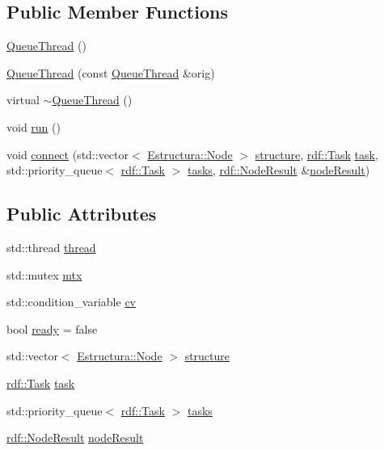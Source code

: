 \subsection*{Public Member Functions}
\begin{DoxyCompactItemize}
\item 
\hyperlink{classQueueThread_a67e91d4fedd650255e9389c50b4e6749}{Queue\+Thread} ()
\item 
\hyperlink{classQueueThread_a4a48439ac971b82fa1dd1b63138a4d2b}{Queue\+Thread} (const \hyperlink{classQueueThread}{Queue\+Thread} \&orig)
\item 
virtual \hyperlink{classQueueThread_aeca7000eb51c2f4d2ec33352c8e08ec3}{$\sim$\+Queue\+Thread} ()
\item 
void \hyperlink{classQueueThread_a73db1449c750aab9c973592a69f12e85}{run} ()
\item 
void \hyperlink{classQueueThread_a873d5d9edf446f44467518c8fbde1800}{connect} (std\+::vector$<$ \hyperlink{structEstructura_1_1Node}{Estructura\+::\+Node} $>$ \hyperlink{classQueueThread_ab591bae3315c80df7fa723db66e763fa}{structure}, \hyperlink{classrdf_1_1Task}{rdf\+::\+Task} \hyperlink{classQueueThread_a4cf069642e3f67ff759a2163fa2ef3ce}{task}, std\+::priority\+\_\+queue$<$ \hyperlink{classrdf_1_1Task}{rdf\+::\+Task} $>$ \hyperlink{classQueueThread_a8e8f59dccfcb4a213db1b42aec0e4f4d}{tasks}, \hyperlink{classrdf_1_1NodeResult}{rdf\+::\+Node\+Result} \&\hyperlink{classQueueThread_aa775f99b02ff36d5336212ae53bd12b4}{node\+Result})
\end{DoxyCompactItemize}
\subsection*{Public Attributes}
\begin{DoxyCompactItemize}
\item 
std\+::thread \hyperlink{classQueueThread_a91bdd16de58d62287968b80f68620033}{thread}
\item 
std\+::mutex \hyperlink{classQueueThread_a7bf4df2e118ced2e8fbbac3af8992d79}{mtx}
\item 
std\+::condition\+\_\+variable \hyperlink{classQueueThread_a51fdcc17ea346cf6bbc51467d49e9696}{cv}
\item 
bool \hyperlink{classQueueThread_a26f11295bff95a8a44bb75a58168d611}{ready} = false
\item 
std\+::vector$<$ \hyperlink{structEstructura_1_1Node}{Estructura\+::\+Node} $>$ \hyperlink{classQueueThread_ab591bae3315c80df7fa723db66e763fa}{structure}
\item 
\hyperlink{classrdf_1_1Task}{rdf\+::\+Task} \hyperlink{classQueueThread_a4cf069642e3f67ff759a2163fa2ef3ce}{task}
\item 
std\+::priority\+\_\+queue$<$ \hyperlink{classrdf_1_1Task}{rdf\+::\+Task} $>$ \hyperlink{classQueueThread_a8e8f59dccfcb4a213db1b42aec0e4f4d}{tasks}
\item 
\hyperlink{classrdf_1_1NodeResult}{rdf\+::\+Node\+Result} \hyperlink{classQueueThread_aa775f99b02ff36d5336212ae53bd12b4}{node\+Result}
\end{DoxyCompactItemize}
